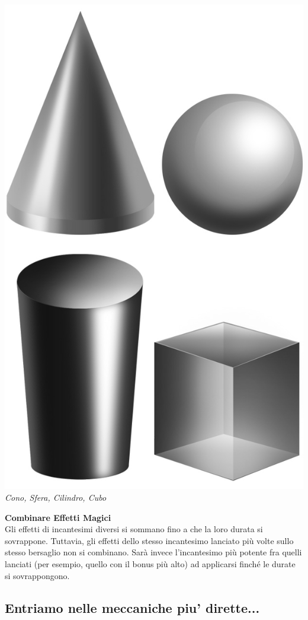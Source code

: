 \begin{multicols}{2}
\begin{center}
	\includegraphics[width=0.9\linewidth]{immagini/3dforme.png}
	\textit{Cono, Sfera, Cilindro, Cubo}
\end{center}

\textbf{Combinare Effetti Magici}\\
Gli effetti di incantesimi diversi si sommano fino a che la loro durata si sovrappone. Tuttavia, gli effetti dello stesso incantesimo lanciato più volte sullo stesso bersaglio non si combinano. Sarà invece l'incantesimo più potente fra quelli lanciati (per esempio, quello con il bonus più alto) ad applicarsi finché le durate si sovrappongono.\\

\subsection{Entriamo nelle meccaniche piu' dirette...}


\end{multicols}
